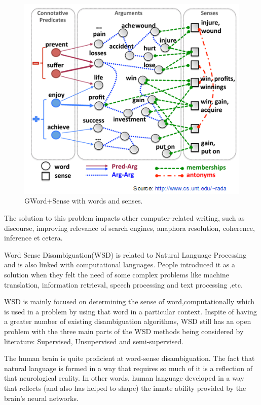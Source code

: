 \begin{figure}[tbh]
	\begin{center}
		\includegraphics[width=\columnwidth]{Union_Background_Chart_WSD}
	\end{center}
	\caption{GWord+Sense with words and senses. \label{fig1}}
\end{figure}

The solution to this problem impacts other computer-related writing, such as discourse, 
improving relevance of search engines, anaphora resolution, coherence, inference et cetera.

Word Sense Disambiguation(WSD) is related to Natural Language Processing and is also linked with computational languages. 
People introduced it as a solution when they felt the need of some complex problems like machine translation, information retrieval, speech processing and text processing ,etc. 

WSD is mainly focused on determining the sense of word,computationally which is used in a problem by using that word in a particular context. 
Inspite of having a greater number of existing disambiguation algorithms, WSD still has an open problem with the three main parts of the WSD methods being considered by literature: Supervised, Unsupervised and semi-supervised. 

The human brain is quite proficient at word-sense disambiguation. 
The fact that natural language is formed in a way that requires so much of it is a reflection of that neurological reality. 
In other words, human language developed in a way that reflects (and also has helped to shape) the innate ability provided by the brain's neural networks. 

